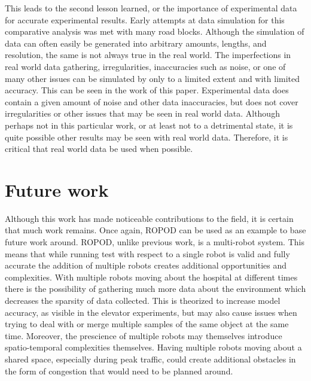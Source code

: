     This leads to the second lesson learned, or the importance of experimental
    data for accurate experimental results. Early attempts at data simulation
    for this comparative analysis was met with many road blocks. Although
    the simulation of data can often easily be generated into arbitrary amounts,
    lengths, and resolution, the same is not always true in the real world.
    The imperfections in real world data gathering, irregularities,
    inaccuracies such as noise, or one of many other issues can be simulated by
    only to a limited extent and with limited accuracy. This can be seen in the
    work of this paper. Experimental data does contain a given amount of noise
    and other data inaccuracies, but does not cover irregularities or other
    issues that may be seen in real world data. Although perhaps not in this
    particular work, or at least not to a detrimental state, it is quite possible
    other results may be seen with real world data. Therefore, it is critical
    that real world data be used when possible. \\

    \section{ Future work }

    Although this work has made noticeable contributions to the field, it is
    certain that much work remains. Once again, ROPOD can be used as an example
    to base future work around. ROPOD, unlike previous work, is a multi-robot
    system. This means that while running test with respect to a single robot
    is valid and fully accurate the addition of multiple robots creates
    additional opportunities and complexities. With multiple robots moving about
    the hospital at different times there is the possibility of gathering much
    more data about the environment which decreases the sparsity of data
    collected. This is theorized to increase model accuracy, as visible in the
    elevator experiments, but may also cause issues when trying to deal with
    or merge multiple samples of the same object at the same time. Moreover,
    the prescience of multiple robots may themselves introduce spatio-temporal
    complexities themselves. Having multiple robots moving about a shared
    space, especially during peak traffic, could create additional obstacles
    in the form of congestion that would need to be planned around. \\

